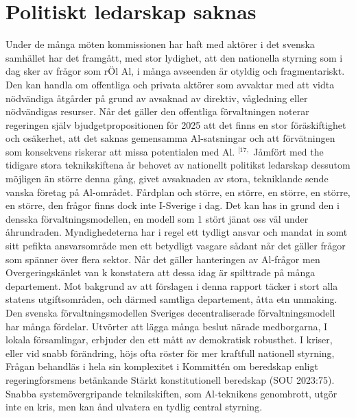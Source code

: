 {\section*{Politiskt ledarskap saknas}
Under de många möten kommissionen har haft med aktörer i det svenska samhället har det framgått, med stor lydighet, att den nationella styrning som i dag sker av frågor som rÖl Al, i många avseenden är otyldig och fragmentariskt. Den kan handla om offentliga och privata aktörer som avvaktar med att vidta nödvändiga åtgårder på grund av avsaknad av direktiv, vågledning eller nödvändigas resurser. Når det gäller den offentliga förvaltningen noterar regeringen själv bjudgetpropositionen för 2025 att det finns en stor föräskiftighet och osäkerhet, att det saknas gemensamma Al-satsningar och att förvätningen som konsekvens riskerar att missa potentialen med Al. \({ }^{[17,}\)
Jåmfört med the tidigare stora teknikskiftena år behovet av nationellt politikst ledarskap dessutom möjligen än större denna gång, givet avsaknaden av stora, tekniklande sende vanska företag på Al-området. Fårdplan och större, en större, en större, en större, en större, den frågor finns dock inte I-Sverige i dag. Det kan has in grund den i densska förvaltningsmodellen, en modell som 1 stört jänat oss väl under åhrundraden. Myndighedeterna har i regel ett tydligt ansvar och mandat in somt sitt pefikta ansvarsområde men ett betydligt vasgare sådant når det gäller frågor som spänner över flera sektor. Når det gäller hanteringen av Al-frågor men Overgeringskänlet van \(\mathrm{k}\) konstatera att dessa idag är spilttrade på många departement. Mot bakgrund av att förslagen i denna rapport täcker i stort alla statens utgiftsområden, och därmed samtliga departement, åtta etn unmaking.
Den svenska förvaltningsmodellen
Sveriges decentraliserade förvaltningsmodell har många fördelar. Utvörter att lägga många beslut närade medborgarna, I lokala församlingar, erbjuder den ett mått av demokratisk robusthet. I kriser, eller vid snabb förändring, höjs ofta röster för mer kraftfull nationell styrning, Frågan behandläs i hela sin komplexitet i Kommittén om beredskap enligt regeringforsmens betänkande Stärkt konstitutionell beredskap (SOU 2023:75). Snabba systemövergripande teknikskiften, som Al-teknikens genombrott, utgör inte en kris, men kan ånd ulvatera en tydlig central styrning.
}
